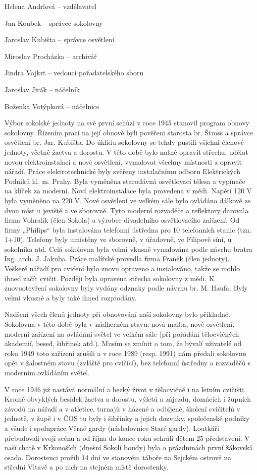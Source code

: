 Helena Andrlová -- vzdělavatel

Jan Koubek -- správce sokolovny

Jaroslav Kubišta -- správce osvětlení

Miroslav Procházka -- archivář

Jindra Vajkrt -- vedoucí pořadatelského sboru

Jaroslav Jirák -- náčelník

Boženka Votýpková -- náčelnice

Výbor sokolské jednoty na své první schůzi v roce 1945 stanovil program
obnovy sokolovny. Řízením prací na její obnově byli pověřeni starosta
br. Štross a správce osvětlení br. Jar. Kubišta. Do úklidu sokolovny se
tehdy pustili všichni členové jednoty, včetně žactva a dorostu. V této
době bylo nutné opravit střechu, udělat novou elektroinstalaci a nové
osvětlení, vymalovat všechny místnosti a opravit nářadí. Práce
elektrotechnické byly svěřeny instalačnímu odboru Elektrických Podniků
hl. m. Prahy. Byla vyměněna starodávná osvětlovací tělesa a vypínače na
klíček za moderní. Nová elektroinstalace byla provedena v mědi. Napětí
120 V byla vyměněno na 220 V. Nové osvětlení ve velkém sále bylo
ovládáno dálkově ze dvou míst u jeviště a ve sborovně. Tyto moderní
rozvaděče a reflektory darovala firma Vohralík (člen Sokola) a výrobce
divadelního osvětlovacího zařízení. Od firmy „Philips`` byla instalována
telefonní ústředna pro 10 telefonních stanic (tzn. 1+10). Telefony byly
umístěny ve sborovně, v úřadovně, ve Filipově síni, u sokolníka atd.
Celá sokolovna byla velmi vkusně vymalována podle návrhu bratra Ing.
arch. J. Jakuba. Práce malířské provedla firma Franěk (člen jednoty).
Veškeré nářadí pro cvičení bylo znovu opraveno a instalováno, takže se
mohlo ihned začít cvičit. Později byla opravena střecha sokolovny z
mědi. K znovuotevření sokolovny byly vydány odznaky podle návrhu br. M.
Haufa. Byly velmi vkusné a byly také ihned rozprodány.

Nadšení všech členů jednoty při obnovování naší sokolovny bylo
příkladné. Sokolovna v této době byla v nádherném stavu: nová malba,
nové osvětlení, moderní zařízení na ovládání světel ve velkém sále (při
pořádání tělocvičných akademií, besed, šibřinek atd.). Musím se zmínit o
tom, že bývalí uživatelé od roku 1949 toto zařízení zrušili a v roce
1989 (resp. 1991) nám předali sokolovnu opět v žalostném stavu (zvláště
pro cvičící), bez telefonní ústředny a rozvaděčů s moderním ovládáním
světel.

V roce 1946 již nastává normální a hezký život v tělocvičně i na letním
cvičišti. Kromě obvyklých besídek žactva a dorostu, výletů a zájezdů,
domácích i župních závodů na nářadí a v atletice, turnajů v házené a
odbíjené, školení cvičitelů v jednotě, v župě i v ČOS tu byly i šibřinky
a jejich dozvuky, společenské podniky a všude i spolupráce Věrné gardy
(následovnice Staré gardy). Loutkáři přebudovali svoji scénu a od října
do konce roku sehráli dětem 25 představení. V naší chatě v Krkonoších
(dnešní Sokolí boudy) byla o prázdninách první žákovská osada.
Dorostenci prožili 14 dní ve stanovém táboře na Sejckém ostrově na
střední Vltavě a po nich na stejném místě dorostenky.

